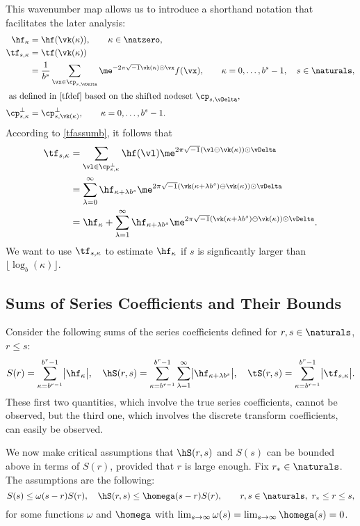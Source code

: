 \documentclass[]{elsarticle}
\theoremstyle{definition}
\theoremstyle{remark}
\begin{document}
This wavenumber map allows us to introduce a shorthand notation that facilitates the later analysis:
\begin{align*}
\hf_{\kappa} & =\hf(\vk(\kappa)), \qquad \kappa \in \natzero,\\
\tf_{s,\kappa}& = \tf(\vk(\kappa)) \\
& = \frac{1}{b^s} \sum_{\vx \in \cp_{s,\vDelta}} \me^{-2 \pi \sqrt{-1} \vk(\kappa) \odot \vx} f(\vx), \qquad \kappa=0, \ldots, b^s-1, \quad s \in \naturals,\\
\intertext{ as defined in \eqref{tfdef} based on the shifted nodeset $\cp_{s,\vDelta}$,}
\cp^{\perp}_{s,\kappa}&=\cp^{\perp}_{s,\vk(\kappa)}, \qquad \kappa=0, \ldots, b^s-1.
\end{align*}
According to \eqref{tfassumb}, it follows that
\begin{align}
\nonumber
\tf_{s,\kappa} &= \sum_{\vl \in \cp^{\perp}_{s,\kappa}} \hf(\vl) \me^{2 \pi \sqrt{-1} (\vl \ominus \vk(\kappa)) \odot \vDelta} \\
\nonumber
&= \sum_{\lambda=0}^{\infty} \hf_{\kappa+\lambda b^{s}} \me^{2 \pi \sqrt{-1} (\vk(\kappa+\lambda b^{s}) \ominus \vk(\kappa)) \odot \vDelta} \\
& = \hf_{\kappa} + \sum_{\lambda=1}^{\infty} \hf_{\kappa+\lambda b^{s}} \me^{2 \pi \sqrt{-1} (\vk(\kappa+\lambda b^{s}) \ominus \vk(\kappa)) \odot \vDelta}.
\label{tfassumc}
\end{align}
We want to use $\tf_{s,\kappa}$ to estimate $\hf_{\kappa}$ if $s$ is signficantly larger than $\lfloor \log_b(\kappa) \rfloor$.

\subsection{Sums of Series Coefficients and Their Bounds}
Consider the following sums of the series coefficients defined for $r,s \in \naturals$, $r \le s$:
\begin{equation}
S(r) =  \sum_{\kappa=b^{r-1}}^{b^{r}-1} \bigl \lvert \hf_{\kappa} \bigr \rvert, \quad
\hS(r,s)  = \sum_{\kappa=b^{r-1}}^{b^{r}-1} \sum_{\lambda=1}^{\infty} \bigl \lvert \hf_{\kappa+\lambda b^{s}}\bigr\rvert, \quad
\tS(r,s) = \sum_{\kappa=b^{r-1}}^{b^{r}-1} \bigl \lvert \tf_{s,\kappa}\bigr\rvert.
\end{equation}
These first two quantities, which involve the true series coefficients, cannot be observed, but the third one, which involves the discrete transform coefficients, can easily be observed.

We now make critical assumptions that $\hS(r,s)$ and $S(s)$ can be bounded above in terms of $S(r)$, provided that $r$ is large enough.  Fix $r_* \in \naturals$.  The assumptions are the following:
\begin{equation}
S(s) \le \omega(s-r) S(r), \quad \hS(r,s) \le \homega(s-r) S(r), \qquad r,s \in \naturals, \ r_* \le r \le s,
\end{equation}
for some functions $\omega$ and $\homega$ with $\lim_{s \to \infty} \omega(s) = \lim_{s \to \infty} \homega(s) = 0$.
\end{document}
